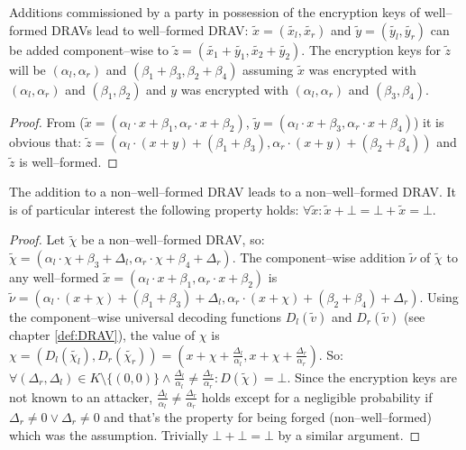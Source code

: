\begin{lem}
  \label{lem:DRAV-add}

Additions commissioned by a party in possession of the encryption keys of
well--formed DRAVs lead to well--formed DRAV: $\widetilde{x} =
(\widetilde{x_l}, \widetilde{x_r})$ and $\widetilde{y} = (\widetilde{y_l},
\widetilde{y_r})$ can be added component--wise to $\widetilde{z} =
\left(\widetilde{x_1} + \widetilde{y_1}, \widetilde{x_2} +
\widetilde{y_2}\right)$. The encryption keys for $\widetilde{z}$ will be
$(\alpha_l, \alpha_r)$ and $(\beta_1 + \beta_3, \beta_2 + \beta_4)$ assuming
$\widetilde{x}$ was encrypted with $(\alpha_l, \alpha_r)$ and $(\beta_1,
\beta_2)$ and $y$ was encrypted with $(\alpha_l, \alpha_r)$ and $(\beta_3,
\beta_4)$.

\end{lem}
\begin{proof}

From ($\widetilde{x} = \left(\alpha_l \cdot x + \beta_1,
\alpha_r \cdot x + \beta_2\right)$, $\widetilde{y} = \left(\alpha_l \cdot x +
\beta_3, \alpha_r \cdot x + \beta_4\right)$) it is obvious that: $\widetilde{z}
= \left(\alpha_l \cdot (x+y) + (\beta_1 + \beta_3), \alpha_r \cdot (x+y) +
(\beta_2 + \beta_4)\right)$ and $\widetilde{z}$ is well--formed.

\end{proof}

\begin{lem}
  \label{lem:DRAV-add-bad}

The addition to a non--well--formed DRAV leads to a non--well--formed DRAV. It
is of particular interest the following property holds: $\forall \widetilde{x}:
\widetilde{x} + \bot = \bot + \widetilde{x} = \bot$.

\end{lem}
\begin{proof}

Let $\widetilde{\chi}$ be a non--well--formed DRAV, so: $\widetilde{\chi} =
(\alpha_l \cdot \chi + \beta_3 + \Delta_l, \alpha_r \cdot \chi + \beta_4 +
\Delta_r)$. The component--wise addition $\widetilde{\nu}$ of $\widetilde{\chi}$
to any well--formed $\widetilde{x} = (\alpha_l \cdot x + \beta_1, \alpha_r \cdot
x + \beta_2)$ is $\widetilde{\nu} = (\alpha_l \cdot (x+\chi) + (\beta_1+\beta_3)
+ \Delta_l, \alpha_r \cdot (x+\chi) + (\beta_2+\beta_4) + \Delta_r)$.  Using the
component--wise universal decoding functions $D_l(\widetilde{v})$ and
$D_r(\widetilde{v})$ (see chapter \ref{def:DRAV}), the value of $\chi$ is $\chi
= (D_l(\widetilde{\chi_l}), D_r(\widetilde{\chi_r})) = (x + \chi +
\frac{\Delta_l}{\alpha_l}, x + \chi + \frac{\Delta_r}{\alpha_r})$. So: $\forall
(\Delta_r, \Delta_l) \in K \setminus \{(0, 0)\} \wedge \frac{\Delta_l}{\alpha_l}
\neq \frac{\Delta_r}{\alpha_r}: D(\widetilde{\chi}) = \bot$. Since the
encryption keys are not known to an attacker, $\frac{\Delta_l}{\alpha_l} \neq
\frac{\Delta_r}{\alpha_r}$ holds except for a negligible probability if
$\Delta_r \neq 0 \vee \Delta_r \neq 0$ and that's the property for being forged
(non--well--formed) which was the assumption. Trivially $\bot + \bot = \bot$ by
a similar argument.

\end{proof}


